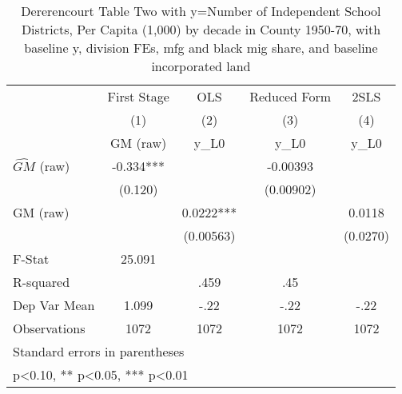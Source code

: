 \begin{table}[htbp]\centering
\def\sym#1{\ifmmode^{#1}\else\(^{#1}\)\fi}
\caption{Dererencourt Table Two with y=Number of Independent School Districts, Per Capita (1,000) by decade in County 1950-70, with baseline y, division FEs, mfg and black mig share, and baseline incorporated land}
\begin{tabular}{l*{4}{c}}
\toprule
                    & First Stage   &         OLS   &Reduced Form   &        2SLS   \\
                    &\multicolumn{1}{c}{(1)}&\multicolumn{1}{c}{(2)}&\multicolumn{1}{c}{(3)}&\multicolumn{1}{c}{(4)}\\
                    &\multicolumn{1}{c}{GM  (raw)}&\multicolumn{1}{c}{y\_L0}&\multicolumn{1}{c}{y\_L0}&\multicolumn{1}{c}{y\_L0}\\
\midrule
$\hat{GM}$ (raw)    &      -0.334***&               &    -0.00393   &               \\
                    &     (0.120)   &               &   (0.00902)   &               \\
\addlinespace
GM  (raw)           &               &      0.0222***&               &      0.0118   \\
                    &               &   (0.00563)   &               &    (0.0270)   \\
\midrule
F-Stat              &      25.091   &               &               &               \\
R-squared           &               &        .459   &         .45   &               \\
Dep Var Mean        &       1.099   &        -.22   &        -.22   &        -.22   \\
Observations        &        1072   &        1072   &        1072   &        1072   \\
\bottomrule
\multicolumn{5}{l}{\footnotesize Standard errors in parentheses}\\
\multicolumn{5}{l}{\footnotesize * p<0.10, ** p<0.05, *** p<0.01}\\
\end{tabular}
\end{table}
